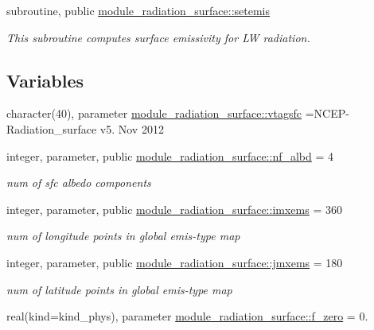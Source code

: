 {\bf }\par
\begin{DoxyCompactItemize}
\item 
subroutine, public \hyperlink{group__module__radiation__surface_gae6b9cfae267270c6b338e5edafdd2456}{module\+\_\+radiation\+\_\+surface\+::setemis}
\begin{DoxyCompactList}\small\item\em This subroutine computes surface emissivity for LW radiation. \end{DoxyCompactList}\end{DoxyCompactItemize}

\subsection*{Variables}
\begin{DoxyCompactItemize}
\item 
character(40), parameter \hyperlink{namespacemodule__radiation__surface_ab0b8c10a0fb6be2644fdf91e3fe1fc5c}{module\+\_\+radiation\+\_\+surface\+::vtagsfc} =\textquotesingle{}N\+C\+EP-\/Radiation\+\_\+surface v5. Nov 2012 \textquotesingle{}
\item 
integer, parameter, public \hyperlink{group__module__radiation__surface_gab7800982c900bd632ca74d5e7d2b5ab3}{module\+\_\+radiation\+\_\+surface\+::nf\+\_\+albd} = 4
\begin{DoxyCompactList}\small\item\em num of sfc albedo components \end{DoxyCompactList}\item 
integer, parameter, public \hyperlink{group__module__radiation__surface_gaab4b9853c71ff40f8db2aa78b7cab265}{module\+\_\+radiation\+\_\+surface\+::imxems} = 360
\begin{DoxyCompactList}\small\item\em num of longitude points in global emis-\/type map \end{DoxyCompactList}\item 
integer, parameter, public \hyperlink{group__module__radiation__surface_ga3922674f1c727d517ba5b0f7f5093970}{module\+\_\+radiation\+\_\+surface\+::jmxems} = 180
\begin{DoxyCompactList}\small\item\em num of latitude points in global emis-\/type map \end{DoxyCompactList}\item 
real(kind=kind\+\_\+phys), parameter \hyperlink{group__module__radiation__surface_ga86e4f42e46e188303b9a8e4d503d1acb}{module\+\_\+radiation\+\_\+surface\+::f\+\_\+zero} = 0.

\end{DoxyCompactItemize}
